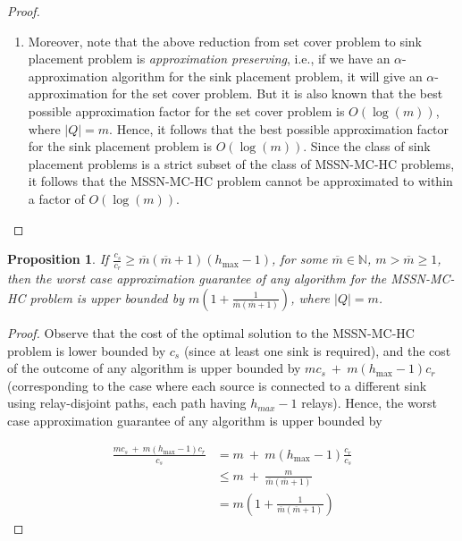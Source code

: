 \documentclass[conference]{IEEEtran}
\newcommand{\mbar}{\overline{m}}
\newtheorem{proposition}{Proposition}
\begin{document}
\begin{proof}
\begin{enumerate}
\item Moreover, note that the above reduction from set cover problem to sink placement problem is \emph{approximation preserving}, i.e., if we have an $\alpha$-approximation algorithm for the sink placement problem, it will give an $\alpha$-approximation for the set cover problem. But it is also known that the best possible approximation factor for the set cover problem is $O(\log(m))$, where $|Q|=m$. Hence, it follows that the best possible approximation factor for the sink placement problem is $O(\log(m))$. Since the class of sink placement problems is a strict subset of the class of MSSN-MC-HC problems, it follows that the MSSN-MC-HC problem cannot be approximated to within a factor of $O(\log(m))$.
\end{enumerate}
\end{proof}

\begin{proposition}
If $\frac{c_s}{c_r}\geq \mbar(\mbar+1)(h_{\max}-1)$, for some $\mbar\in\mathbb{N}$, $m > \mbar \geq 1$, then the worst case approximation guarantee of any algorithm for the MSSN-MC-HC problem is upper bounded by $m\left(1+\frac{1}{\mbar(\mbar + 1)}\right)$, where $|Q|=m$. 
\end{proposition}
\begin{proof}
Observe that the cost of the optimal solution to the MSSN-MC-HC problem is lower bounded by $c_s$ (since at least one sink is required), and the cost of the outcome of any algorithm is upper bounded by $mc_s\: +\: m(h_{\max}-1)c_r$ (corresponding to the case where each source is connected to a different sink using relay-disjoint paths, each path having $h_{max}-1$ relays). Hence, the worst case approximation guarantee of any algorithm is upper bounded by

\begin{align}
\frac{mc_s\: +\: m(h_{\max}-1)c_r}{c_s}&= m\:+\:m(h_{\max}-1)\frac{c_r}{c_s}\nonumber\\
&\leq m\:+\:\frac{m}{\mbar(\mbar + 1)}\nonumber\\
&= m\left(1+\frac{1}{\mbar(\mbar + 1)}\right)\nonumber
\end{align}
\end{proof}
\end{document}
